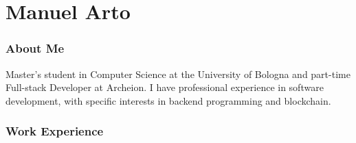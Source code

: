 \documentclass{tccv}
\begin{document}
\part{Manuel Arto}

\section{About Me}

Master's student in Computer Science at the University of Bologna and part-time Full-stack Developer at Archeion.\newline
I have professional experience in software development, with specific interests in backend programming and blockchain. 

\section{Work Experience}
\end{document}
